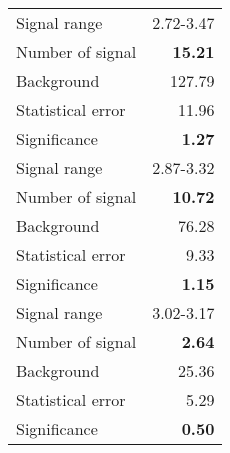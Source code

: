  {\large{
 \begin{tabular}{||l r||}
 \hline
 \hline
Signal range &      2.72-3.47 \\
Number of signal &  \textbf{  15.21} \\
Background &         127.79 \\
Statistical error &   11.96 \\
Significance &      \textbf{   1.27} \\
 \hline
Signal range &      2.87-3.32 \\
Number of signal &  \textbf{  10.72} \\
Background &          76.28 \\
Statistical error &    9.33 \\
Significance &      \textbf{   1.15} \\
 \hline
Signal range &      3.02-3.17 \\
Number of signal &  \textbf{   2.64} \\
Background &          25.36 \\
Statistical error &    5.29 \\
Significance &      \textbf{   0.50} \\
 \hline
 \hline
 \end{tabular}
 }}
 \endinput
